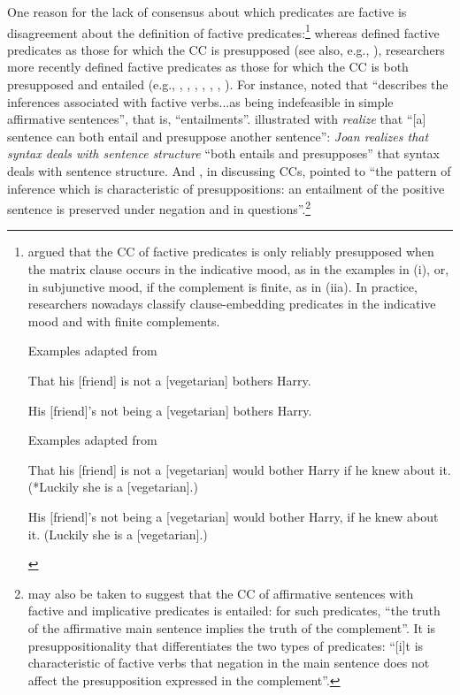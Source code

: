 \documentclass[11pt,fleqn]{article}
\newcommand{\6}{\mbox{$[\hspace*{-.6mm}[$}}
\newcommand{\9}{\mbox{$]\hspace*{-.6mm}]$}}
\begin{document}
One reason for the lack of consensus about which predicates are factive is disagreement about the definition of factive predicates:\footnote{\citet[56]{karttunen71b} argued that the CC of factive predicates is only reliably presupposed when the matrix clause occurs in the indicative mood, as in the examples in (i), or, in subjunctive mood, if the complement is finite, as in (iia). In practice, researchers nowadays classify clause-embedding predicates in the indicative mood and with finite complements.

\begin{exe}
 Examples adapted from \citealt[60]{karttunen71b}
\begin{xlist}
\ex That his [friend] is not a [vegetarian] bothers Harry. 

\ex His [friend]'s not being a [vegetarian] bothers Harry.

\end{xlist}
 Examples adapted from \citealt[60f.]{karttunen71b}
\begin{xlist}
\ex That his [friend] is not a [vegetarian] would bother Harry if he knew about it. (*Luckily she is a [vegetarian].)

\ex His [friend]'s not being a [vegetarian] would bother Harry, if he knew about it. (Luckily she is a [vegetarian].)

\end{xlist}
\end{exe}
} whereas \citealt{kiparsky-kiparsky70} defined factive predicates as those for which the CC is presupposed (see also, e.g., \citealt{karttunen71-implicative,karttunen71b}), researchers more recently defined factive predicates as those for which the CC is both presupposed and entailed (e.g., \citealt[119-123]{gazdar79a}, \citealt[355]{ccmg90}, \citealt[345]{vds92},  \citealt[3]{abbott06}, \citealt[139]{schlenker10}, \citealt[77]{anand-hacquard2014}, \citealt[fn.7]{spector-egre2015}). For instance, \citet[66f.]{beaver01} noted that \citet[119-123]{gazdar79a} ``describes the inferences associated with factive verbs...as being indefeasible in simple affirmative sentences'', that is, ``entailments''. \citet[355]{ccmg90} illustrated with {\em realize} that ``[a] sentence can both entail and presuppose another sentence'': {\em Joan realizes that syntax deals with sentence structure} ``both entails and presupposes'' that syntax deals with sentence structure. And \citet[139]{schlenker10}, in discussing CCs, pointed to ``the pattern of inference which is characteristic of presuppositions: an entailment of the positive sentence is preserved under negation and in questions''.\footnote{\citet[342f]{karttunen71-implicative} may also be taken to suggest that the CC of affirmative sentences with factive and implicative predicates is entailed: for such predicates, ``the truth of the affirmative main sentence implies the truth of the complement''. It is presuppositionality that differentiates the two types of predicates: ``[i]t is characteristic of factive verbs that negation in the main sentence does not affect the presupposition expressed in the complement''.}
\end{document}

